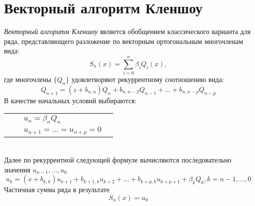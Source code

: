 \section{Векторный алгоритм Кленшоу}
\emph {Векторный алгоритм Кленшоу} является обобщением
классического варианта для ряда, представляющего разложение по
векторным ортогональным многочленам вида:
$$%
S_n(x)=\sum\limits_{i=0}^{n}\beta_iQ_i(x),
$$%
где многочлены $\{Q_n\}$ удовлетворяют рекуррентному соотношению
вида:
$$%
Q_{n+1}=(z+b_{n,n})Q_n+b_{n,n-2}Q_{n-1}+\ldots+b_{n,n-p}Q_{n-p}
$$%
В качестве начальных условий выбираются: \\
\begin{tabular} {llll}
&    &    $u_n=\beta_nQ_n$ \\
&    &    $u_{n+1}=\ldots=u_{n+p}=0$ \\
\end{tabular} \\
Далее по рекуррентной следующей формуле  вычисляются последовательно значения $u_{n-1},\ldots,u_0$\\
$$
u_k=(x+b_{k,k})u_{k+1}+b_{k+1,k}u_{k+2}+\ldots+b_{k+p,k}u_{k+p+1}+\beta_kQ_0,
k=n-1,\ldots,0
$$
Частичная сумма ряда в результате $$S_n(x)=u_0$$

